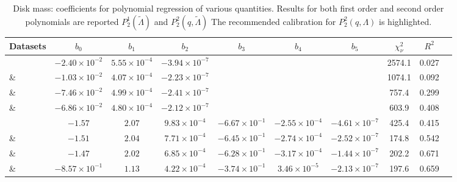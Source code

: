 \begin{table*}
    \caption{
        \label{tab:diskfit:poly}
        Disk mass:
        coefficients for polynomial regression of various
        quantities. Results for both
        first order and second order polynomials are reported $P_2^1(\tilde{\Lambda})$ and $P_2^2(q, \tilde{\Lambda})$
        The recommended calibration for $P_2^2(q,\Lambda)$ is highlighted.
    }
    \begin{tabular}{l|ccccccccc}
        \hline\hline
        Datasets & $b_0$ & $b_1$ & $b_2$ & $b_3$ & $b_4$ & $b_5$ &  $\chi^2_{\nu}$ & $R^2$  \\
        \hline
        \DSrefset{} & $-2.40\times10^{-2}$ & $5.55\times10^{-4}$ & $-3.94\times10^{-7}$ & & & & 2574.1 & 0.027 \\ 
        \& \DSheatcool{} & $-1.03\times10^{-2}$ & $4.07\times10^{-4}$ & $-2.23\times10^{-7}$ & & & & 1074.1 & 0.092 \\ 
        \& \DScool{} & $-7.46\times10^{-2}$ & $4.99\times10^{-4}$ & $-2.41\times10^{-7}$ & & & & 757.4 & 0.299 \\ 
        \& \DSnone{} & $-6.86\times10^{-2}$ & $4.80\times10^{-4}$ & $-2.12\times10^{-7}$ & & & & 603.9 & 0.408 \\ 
        \hline
        \DSrefset{} & $-1.57$ & $2.07$ & $9.83\times10^{-4}$ & $-6.67\times10^{-1}$ & $-2.55\times10^{-4}$ & $-4.61\times10^{-7}$ & 425.4 & 0.415 \\ 
\rowcolor{lightgray} \& \DSheatcool{} & $-1.51$ & $2.04$ & $7.71\times10^{-4}$ & $-6.45\times10^{-1}$ & $-2.74\times10^{-4}$ & $-2.52\times10^{-7}$ & 174.8 & 0.542 \\ 
        \& \DScool{} & $-1.47$ & $2.02$ & $6.85\times10^{-4}$ & $-6.28\times10^{-1}$ & $-3.17\times10^{-4}$ & $-1.44\times10^{-7}$ & 202.2 & 0.671 \\ 
        \& \DSnone{} & $-8.57\times10^{-1}$ & $1.13$ & $4.22\times10^{-4}$ & $-3.74\times10^{-1}$ & $3.46\times10^{-5}$ & $-2.13\times10^{-7}$ & 197.6 & 0.659 \\ 
        \hline\hline
    \end{tabular}
\end{table*}

